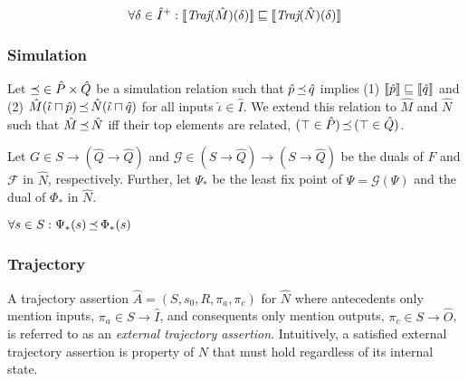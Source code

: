 

\begin{equation*}
\forall \delta \in \hat I^{+} : \llbracket\textit{Traj}(\hat M)(\delta)\rrbracket \sqsubseteq \llbracket\textit{Traj}(\hat N)(\delta)\rrbracket
\end{equation*}


\subsubsection{Simulation} Let $\operatorname{\mathrel{\preceq}} \in \hat P \times \hat Q$ be a simulation relation such that $\hat p \operatorname{\mathrel{\preceq}} \hat q$ implies (1) $\llbracket\hat p\rrbracket \sqsubseteq \llbracket\hat q\rrbracket$ and (2) $\hat M(\hat \iota \sqcap \hat p) \operatorname{\mathrel{\preceq}} \hat N(\hat \iota \sqcap \hat q)$ for all inputs $\hat \iota \in \hat I$. We extend this relation to $\hat M$ and $\hat N$ such that $\hat M \operatorname{\mathrel{\preceq}} \hat N$ iff their top elements are related, $(\top \in \hat P) \operatorname{\mathrel{\preceq}} \, (\top \in \hat Q)$.






Let $G \in S \rightarrow (\hat Q \rightarrow \hat Q)$ and $\mathcal{G} \in (S \rightarrow \hat Q) \rightarrow (S \rightarrow \hat Q)$ be the duals of $F$ and $\mathcal{F}$ in $\hat N$, respectively. Further, let $\Psi_{*}$ be the least fix point of $\Psi = \mathcal{G}(\Psi)$ and the dual of $\Phi_{*}$ in $\hat N$.

\begin{lemma}
$\forall s \in S : \Psi_{*}(s) \operatorname{\mathrel{\preceq}} \Phi_{*}(s)$
\end{lemma}

\subsubsection{Trajectory} A trajectory assertion $\hat A = (S,s_{0},R,\pi_{a},\pi_{c})$ for $\hat N$ where antecedents only mention inputs, $\pi_{a} \in S \rightarrow \hat I$, and consequents only mention outputs, $\pi_{c} \in S \rightarrow \hat O$, is referred to as an \textit{external trajectory assertion}. Intuitively, a satisfied external trajectory assertion is property of $N$ that must hold regardless of its internal state.


